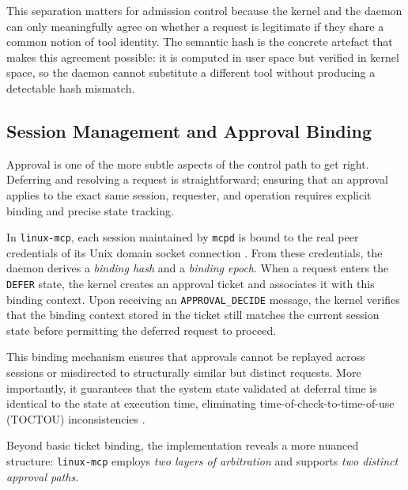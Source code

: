 This separation matters for admission control because the kernel and the daemon can only meaningfully agree on whether a request is legitimate if they share a common notion of tool identity.
The semantic hash is the concrete artefact that makes this agreement possible: it is computed in user space but verified in kernel space, so the daemon cannot substitute a different tool without producing a detectable hash mismatch.




\subsection{Session Management and Approval Binding}

Approval is one of the more subtle aspects of the control path to get right.
Deferring and resolving a request is straightforward; ensuring that an approval applies to the exact same session, requester, and operation requires explicit binding and precise state tracking.

In \texttt{linux-mcp}, each session maintained by \texttt{mcpd} is bound to the real peer credentials of its Unix domain socket connection \cite{stevens2013unix}.
From these credentials, the daemon derives a \emph{binding hash} and a
\emph{binding epoch}.
When a request enters the \texttt{DEFER} state, the kernel creates an approval ticket and associates it with this binding context.
Upon receiving an \texttt{APPROVAL\_DECIDE} message, the kernel verifies that the binding context stored in the ticket still matches the current session state before permitting the deferred request to proceed.

This binding mechanism ensures that approvals cannot be replayed across sessions or misdirected to structurally similar but distinct requests.
More importantly, it guarantees that the system state validated at deferral time is identical to the state at execution time, eliminating time-of-check-to-time-of-use (TOCTOU) inconsistencies \cite{bishop2003computer, bishop1996racecond}.

Beyond basic ticket binding, the implementation reveals a more nuanced structure: \texttt{linux-mcp} employs \emph{two layers of arbitration} and supports \emph{two distinct approval paths}.


